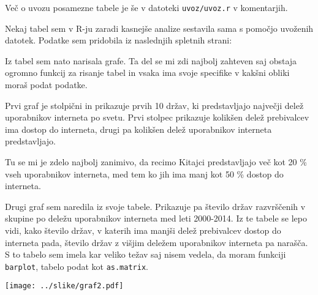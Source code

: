 \documentclass[11pt,a4paper]{article}
\begin{document}
Več o uvozu posamezne tabele je še v datoteki \verb|uvoz/uvoz.r| v komentarjih. 

\smallskip
Nekaj tabel sem v R-ju zaradi kasnejše analize sestavila sama s pomočjo uvoženih datotek.
\bigskip
Podatke sem pridobila iz naslednjih spletnih strani:

\bigskip
Iz tabel sem nato narisala grafe. Ta del se mi zdi najbolj zahteven saj obstaja ogromno funkcij za risanje tabel in vsaka ima svoje specifike v kakšni obliki moraš podat podatke.

\bigskip
Prvi graf je stolpični in prikazuje prvih 10 držav, ki predstavljajo največji delež uporabnikov interneta po svetu. Prvi stolpec prikazuje kolikšen delež prebivalcev ima dostop do interneta, drugi pa kolikšen delež uporabnikov interneta predstavljajo.

Tu se mi je zdelo najbolj zanimivo, da recimo Kitajci predstavljajo več kot 20 \% vseh uporabnikov interneta, med tem ko jih ima manj kot 50 \% dostop do interneta.



\newpage
Drugi graf sem naredila iz svoje tabele. Prikazuje pa število držav razvrščenih v skupine po deležu uporabnikov interneta med leti 2000-2014. Iz te tabele se lepo vidi, kako število držav, v katerih ima manjši delež prebivalcev dostop do interneta pada, število držav z višjim deležem uporabnikov interneta pa narašča.
S to tabelo sem imela kar veliko težav saj nisem vedela, da moram funkciji \verb|barplot|, tabelo podat kot \verb|as.matrix|.

\texttt{[image: ../slike/graf2.pdf]}
\end{document}
